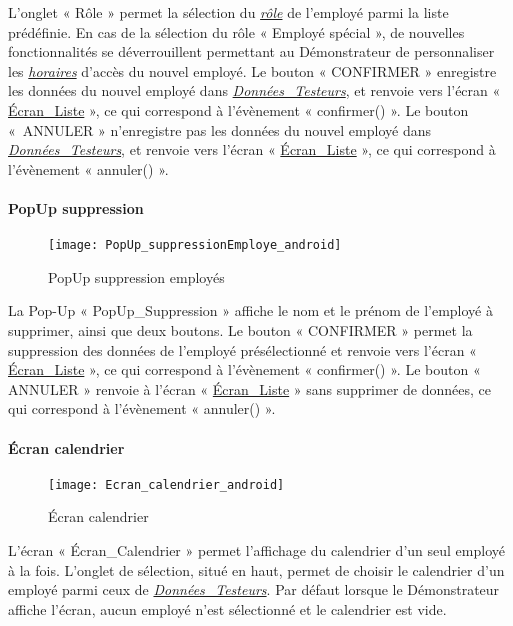 L’onglet « Rôle » permet la sélection du \hyperlink{rol}{\textit{rôle}} de l’employé parmi la liste prédéfinie.
En cas de la sélection du rôle « Employé spécial », de nouvelles fonctionnalités se déverrouillent permettant au Démonstrateur de personnaliser les \hyperlink{hor}{\textit{horaires}} d’accès du nouvel employé.
Le bouton « CONFIRMER » enregistre les données du nouvel employé dans \hyperlink{donneesTesteurs}{\textit{Données\_Testeurs}}, et renvoie vers l’écran « \hyperlink{EcranListe}{Écran\_Liste} », ce qui correspond à l'évènement « confirmer() ».
Le bouton «~ANNULER » n’enregistre pas les données du nouvel employé dans \hyperlink{donneesTesteurs}{\textit{Données\_Testeurs}}, et renvoie vers l’écran « \hyperlink{EcranListe}{Écran\_Liste} », ce qui correspond à l'évènement « annuler() ».

\paragraph{PopUp suppression}
\hypertarget{popUpSuppression}{}

\begin{figure} [H]
    \centering
    \texttt{[image: PopUp\_suppressionEmploye\_android]}
    \caption{PopUp suppression employés}
    \label{PopUp suppression employés}
\end{figure}

La Pop-Up « PopUp\_Suppression » affiche le nom et le prénom de l’employé à supprimer, ainsi que deux boutons. 
Le bouton « CONFIRMER » permet la suppression des données de l’employé présélectionné et renvoie vers l’écran « \hyperlink{EcranListe}{Écran\_Liste} », ce qui correspond à l'évènement « confirmer() ». 
Le bouton « ANNULER » renvoie à l’écran « \hyperlink{EcranListe}{Écran\_Liste} » sans supprimer de données, ce qui correspond à l'évènement « annuler() ».

\paragraph{Écran calendrier}
\hypertarget{EcranCalendrier}{}

\begin{figure} [H]
    \centering
    \texttt{[image: Ecran\_calendrier\_android]}
    \caption{Écran calendrier}
    \label{Écran calendrier}
\end{figure}

L’écran « Écran\_Calendrier » permet l’affichage du calendrier d’un seul employé à la fois. 
L'onglet de sélection, situé en haut, permet de choisir le calendrier d'un employé parmi ceux de \hyperlink{donneesTesteurs}{\textit{Données\_Testeurs}}.
Par défaut lorsque le Démonstrateur affiche l'écran, aucun employé n'est sélectionné et le calendrier est vide. 

